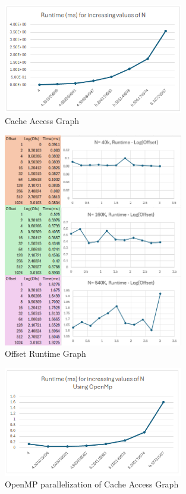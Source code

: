 \documentclass[10pt]{report}
\begin{document}
\begin{figure}[h!]
    \centering
    \includegraphics[width=0.7\textwidth]{cacheAccessGraph.png}
    \caption{Cache Access Graph}
\end{figure}

\begin{figure}[h!]
    \centering
    \includegraphics[width=0.7\textwidth]{OffsetRuntime.png}
    \caption{Offset Runtime Graph}
\end{figure}

\newpage

\begin{figure}[h!]
    \centering
    \includegraphics[width=0.7\textwidth]{OpenMPcacheAccess.png}
    \caption{OpenMP parallelization of Cache Access Graph}
\end{figure}
\end{document}
